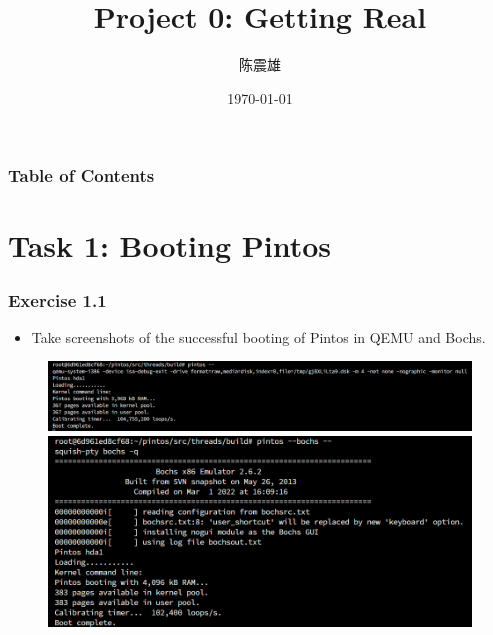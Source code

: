 \documentclass[14pt]{beamer}
\title[PintOS] %
{Project 0: Getting Real}
\author %
{陈震雄}
\institute %
{
 武汉大学 
}
\date %
{\today}
\begin{document}
\frame{\titlepage}

\begin{frame}
    \frametitle{Table of Contents}
    \tableofcontents
\end{frame}

\section{Task 1: Booting Pintos}

\begin{frame}
    \frametitle{Exercise 1.1}
    \begin{itemize}
        \item Take screenshots of the successful booting of Pintos in QEMU and Bochs.
    \end{itemize}
    \begin{figure}
        \centering
        \begin{minipage}{0.8\textwidth}
            \includegraphics[width=\linewidth]{figure/boot1.png}
        \end{minipage}
        \vspace{1cm} %
        \begin{minipage}{0.8\textwidth}
            \includegraphics[width=\linewidth]{figure/boot2.png}
        \end{minipage}
    \end{figure}
\end{frame}
\end{document}
